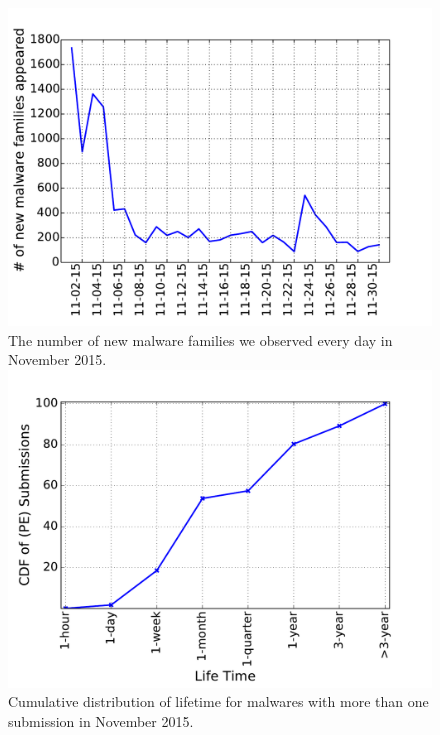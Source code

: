 \begin{figure}[!htb]
  \includegraphics[width=\linewidth]{figure/new_family}
{
The number of new malware families we observed every day in November 2015.
}
\endminipage\hfill
{}
  \includegraphics[width=\linewidth]{figure/lifetime}
{
Cumulative distribution of lifetime for malwares with more than one submission in November 2015.
}
\endminipage\hfill
{}%

\end{figure}
